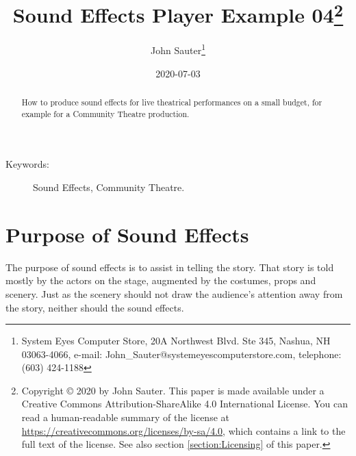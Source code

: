 \documentclass[letterpaper,twoside]{article}
\begin{document}
\title{Sound Effects Player Example 04\footnote{Copyright
    {\copyright} 2020 by John Sauter.
    This paper is made available under a
    Creative Commons Attribution-ShareAlike 4.0 International License.
    You can read a human-readable summary of the license at
    \url{https://creativecommons.org/licenses/by-sa/4.0}, which contains
    a link to the full text of the license.
    See also section \ref{section:Licensing} of this paper.}
}
\author{John Sauter\footnote{
    System Eyes Computer Store,
    20A Northwest Blvd.  Ste 345,
    Nashua, NH  03063-4066,
    e-mail: John\_Sauter@systemeyescomputerstore.com,
    telephone: (603) 424-1188}}
\date{2020-07-03}
\maketitle
\begin{abstract}
  How to produce sound effects for live theatrical performances
  on a small budget,
  for example for a Community Theatre production.
\end{abstract}
\begin{description}
\item[Keywords:]Sound Effects, Community Theatre.
\end{description}
  
\newpage
\section{Purpose of Sound Effects}
The purpose of sound effects is to assist in telling the story.
That story is told mostly by the actors on the stage, augmented
by the costumes, props and scenery.  Just as the scenery should
not draw the audience's attention away from the story, neither
should the sound effects.
\end{document}
